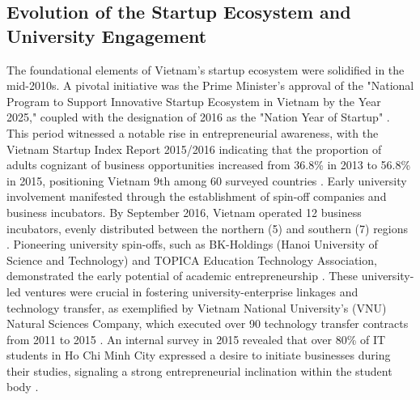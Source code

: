 \documentclass[../Main.tex]{subfiles}%
\begin{document}
	\subsection{Evolution of the Startup Ecosystem and University Engagement}
	The foundational elements of Vietnam's startup ecosystem were solidified in the mid-2010s. A pivotal initiative was the Prime Minister's approval of the "National Program to Support Innovative Startup Ecosystem in Vietnam by the Year 2025," coupled with the designation of 2016 as the "Nation Year of Startup" \autocite{dinh2017promoting}. This period witnessed a notable rise in entrepreneurial awareness, with the Vietnam Startup Index Report 2015/2016 indicating that the proportion of adults cognizant of business opportunities increased from 36.8\% in 2013 to 56.8\% in 2015, positioning Vietnam 9th among 60 surveyed countries \autocite{dinh2017promoting}. Early university involvement manifested through the establishment of spin-off companies and business incubators. By September 2016, Vietnam operated 12 business incubators, evenly distributed between the northern (5) and southern (7) regions \autocite{dinh2017promoting}. Pioneering university spin-offs, such as BK-Holdings (Hanoi University of Science and Technology) and TOPICA Education Technology Association, demonstrated the early potential of academic entrepreneurship \autocite{dinh2017promoting}. These university-led ventures were crucial in fostering university-enterprise linkages and technology transfer, as exemplified by Vietnam National University's (VNU) Natural Sciences Company, which executed over 90 technology transfer contracts from 2011 to 2015 \autocite{dinh2017promoting}. An internal survey in 2015 revealed that over 80\% of IT students in Ho Chi Minh City expressed a desire to initiate businesses during their studies, signaling a strong entrepreneurial inclination within the student body \autocite{dinh2017promoting}.
\end{document}

